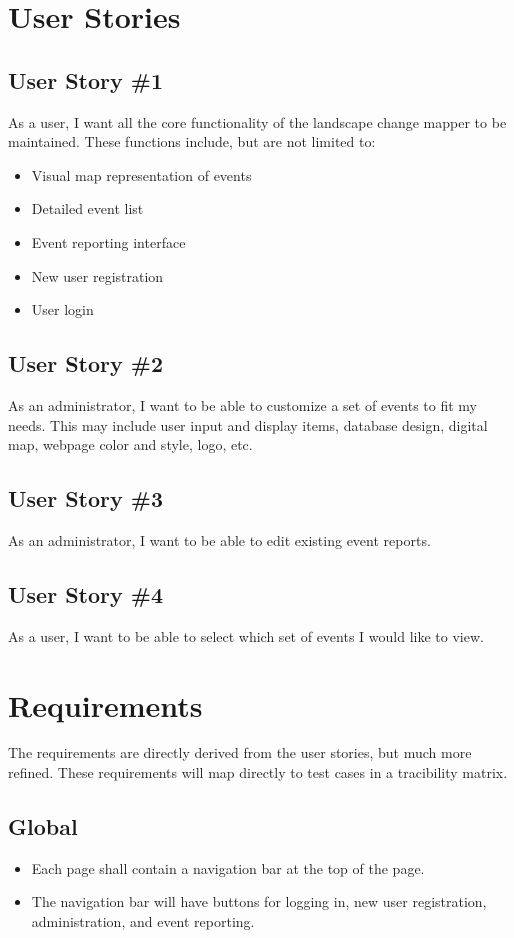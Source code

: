 \section{User Stories}

\subsection{User Story \#1}
As a user, I want all the core functionality of the landscape change mapper to be maintained. These functions include, but are not limited to:
\begin{itemize}
\item Visual map representation of events
\item Detailed event list
\item Event reporting interface
\item New user registration
\item User login
\end{itemize}

\subsection{User Story \#2} 
As an administrator, I want to be able to customize a set of events to fit my needs. This may include user input and display items, database design, digital map, webpage color and style, logo, etc. 

\subsection{User Story \#3} 
As an administrator, I want to be able to edit existing event reports.

\subsection{User Story \#4} 
As a user, I want to be able to select which set of events I would like to view.

\section{Requirements}
The requirements are directly derived from the user stories, but much more refined. These requirements will map directly to test cases in a tracibility matrix.
\subsection{Global}
\begin{itemize}
\item Each page shall contain a navigation bar at the top of the page.
\item The navigation bar will have buttons for logging in, new user registration, administration, and event reporting.
\end{itemize}
